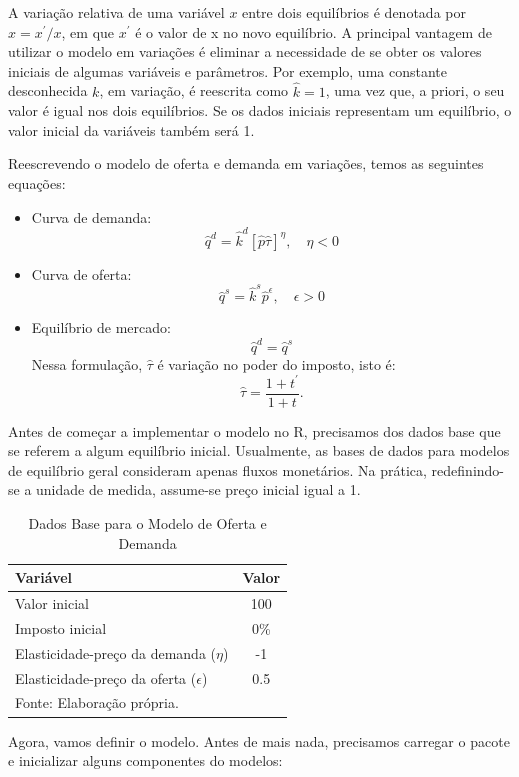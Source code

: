 \documentclass[12pt,twoside]{article}
\providecommand{\tightlist}{%
  \setlength{\itemsep}{0pt}\setlength{\parskip}{0pt}}
\begin{document}
A variação relativa de uma variável \(x\) entre dois equilíbrios é
denotada por \(\hat{x} = x^{\prime}/x\), em que \(x^\prime\) é o valor
de x no novo equilíbrio. A principal vantagem de utilizar o modelo em
variações é eliminar a necessidade de se obter os valores iniciais de
algumas variáveis e parâmetros. Por exemplo, uma constante desconhecida
\(k\), em variação, é reescrita como \(\hat{k} = 1\), uma vez que, a
priori, o seu valor é igual nos dois equilíbrios. Se os dados iniciais
representam um equilíbrio, o valor inicial da variáveis também será 1.

Reescrevendo o modelo de oferta e demanda em variações, temos as
seguintes equações:

\begin{itemize}
\tightlist
\item
  Curva de demanda:
  \[\hat{q}^d = \hat{k}^d [\hat{p}\hat{\tau}]^{\eta}, \quad \eta < 0\]
\item
  Curva de oferta:
  \[\hat{q}^s = \hat{k}^s \hat{p}^{\epsilon}, \quad \epsilon > 0\]
\item
  Equilíbrio de mercado: \[\hat{q}^d = \hat{q}^s\] Nessa formulação,
  \(\hat{\tau}\) é variação no poder do imposto, isto é:
  \[\hat{\tau} = \frac{1 + t^\prime}{1 + t}.\]
\end{itemize}

Antes de começar a implementar o modelo no R, precisamos dos dados base
que se referem a algum equilíbrio inicial. Usualmente, as bases de dados
para modelos de equilíbrio geral consideram apenas fluxos monetários. Na
prática, redefinindo-se a unidade de medida, assume-se preço inicial
igual a 1.

\begin{table}[H]
\caption{Dados Base para o Modelo de Oferta e Demanda}\label{dados_oferta_demanda}
\begin{tabular}{lc}
\toprule
Variável    & Valor\\
\hline
Valor inicial & 100 \\
Imposto inicial & 0\% \\
Elasticidade-preço da demanda ($\eta$) & -1 \\
Elasticidade-preço da oferta ($\epsilon$) & 0.5 \\
\bottomrule
Fonte: Elaboração própria. &  \\
\end{tabular}
\end{table}

Agora, vamos definir o modelo. Antes de mais nada, precisamos carregar o
pacote e inicializar alguns componentes do modelos:
\end{document}
